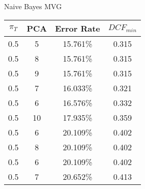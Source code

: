 \caption{Naive Bayes MVG}\label{tab:mvg_naiveacctable}
\begin{center}
\begin{tabular}{|c|c|c|c|}
\hline
$\pi_T$ & PCA & Error Rate & $DCF_{min}$\\
\hline
0.5 & 5 & 15.761\% & 0.315\\
\hline
0.5 & 8 & 15.761\% & 0.315\\
\hline
0.5 & 9 & 15.761\% & 0.315\\
\hline
0.5 & 7 & 16.033\% & 0.321\\
\hline
0.5 & 6 & 16.576\% & 0.332\\
\hline
0.5 & 10 & 17.935\% & 0.359\\
\hline
0.5 & 6 & 20.109\% & 0.402\\
\hline
0.5 & 8 & 20.109\% & 0.402\\
\hline
0.5 & 6 & 20.109\% & 0.402\\
\hline
0.5 & 7 & 20.652\% & 0.413\\
\hline
\end{tabular}
\end{center}
